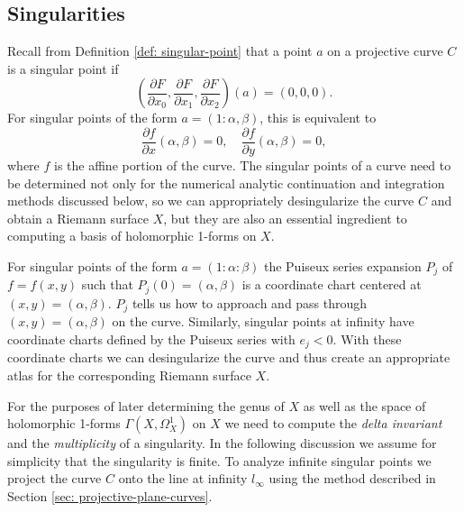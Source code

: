 \subsection{Singularities}\label{subsec:background-singularities}

Recall from Definition \ref{def: singular-point} that a point $a$ on a
projective curve $C$ is a singular point if
\[
  \left( \frac{\partial F}{\partial x_0}, \frac{\partial F}{\partial x_1},
    \frac{\partial F}{\partial x_2} \right) (a) = (0,0,0).
\]
For singular points of the form $a = (1 : \alpha, \beta)$, this is equivalent to
\[
  \frac{\partial f}{\partial x} (\alpha,\beta) = 0, \quad \frac{\partial
    f}{\partial y} (\alpha,\beta) = 0,
\]
where $f$ is the affine portion of the curve. The singular points of a curve
need to be determined not only for the numerical analytic continuation and
integration methods discussed below, so we can appropriately desingularize the
curve $C$ and obtain a Riemann surface $X$, but they are also an essential
ingredient to computing a basis of holomorphic 1-forms on $X$.

For singular points of the form $a = (1 : \alpha : \beta)$ the Puiseux series
expansion $P_j$ of $f = f(x,y)$ such that $P_j(0) = (\alpha, \beta)$ is a
coordinate chart centered at $(x,y) = (\alpha, \beta)$. $P_j$ tells us how to
approach and pass through $(x,y) = (\alpha, \beta)$ on the curve. Similarly,
singular points at infinity have coordinate charts defined by the Puiseux series
with $e_j < 0$. With these coordinate charts we can desingularize the curve and
thus create an appropriate atlas for the corresponding Riemann surface $X$.

For the purposes of later determining the genus of $X$ as well as the space of
holomorphic 1-forms $\Gamma(X,\Omega_X^1)$ on $X$ we need to compute the {\it
  delta invariant} and the {\it multiplicity} of a singularity. In the following
discussion we assume for simplicity that the singularity is finite. To analyze
infinite singular points we project the curve $C$ onto the line at infinity
$l_\infty$ using the method described in Section \ref{sec:
  projective-plane-curves}.

